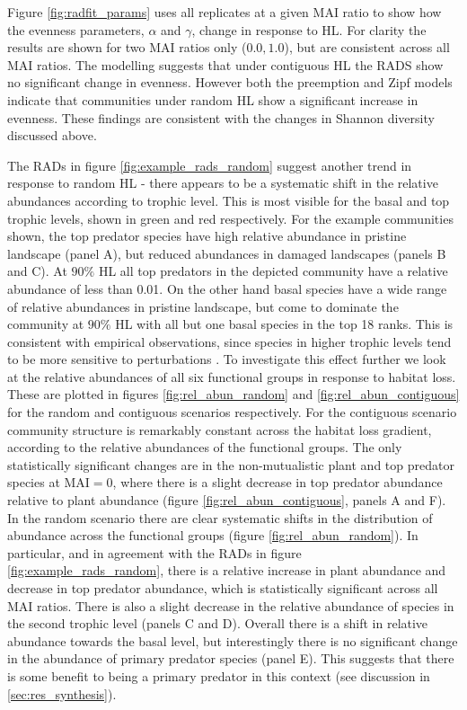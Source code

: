 Figure \ref{fig:radfit_params} uses all replicates at a given MAI ratio to show how the evenness parameters, $\alpha$ and $\gamma$, change in response to HL. For clarity the results are shown for two MAI ratios only ($0.0,1.0$), but are consistent across all MAI ratios. The modelling suggests that under contiguous HL the RADS show no significant change in evenness. However both the preemption and Zipf models indicate that communities under random HL show a significant increase in evenness. These findings are consistent with the changes in Shannon diversity discussed above. 

The RADs in figure \ref{fig:example_rads_random} suggest another trend in response to random HL - there appears to be a systematic shift in the relative abundances according to trophic level. This is most visible for the basal and top trophic levels, shown in green and red respectively. For the example communities shown, the top predator species have high relative abundance in pristine landscape (panel A), but reduced abundances in damaged landscapes (panels B and C). At $90\%$ HL all top predators in the depicted community have a relative abundance of less than 0.01. On the other hand basal species have a wide range of relative abundances in pristine landscape, but come to dominate the community at $90\%$ HL with all but one basal species in the top 18 ranks. This is consistent with empirical observations, since species in higher trophic levels tend to be more sensitive to perturbations \cite{raffaelli2004extinction,dobson2006habitat}. To investigate this effect further we look at the relative abundances of all six functional groups in response to habitat loss. These are plotted in figures \ref{fig:rel_abun_random} and \ref{fig:rel_abun_contiguous} for the random and contiguous scenarios respectively. For the contiguous scenario community structure is remarkably constant across the habitat loss gradient, according to the relative abundances of the functional groups. The only statistically significant changes are in the non-mutualistic plant and top predator species at MAI$=0$, where there is a slight decrease in top predator abundance relative to plant abundance (figure \ref{fig:rel_abun_contiguous}, panels A and F). In the random scenario there are clear systematic shifts in the distribution of abundance across the functional groups (figure \ref{fig:rel_abun_random}). In particular, and in agreement with the RADs in figure \ref{fig:example_rads_random}, there is a relative increase in plant abundance and decrease in top predator abundance, which is statistically significant across all MAI ratios. There is also a slight decrease in the relative abundance of species in the second trophic level (panels C and D). Overall there is a shift in relative abundance towards the basal level, but interestingly there is no significant change in the abundance of primary predator species (panel E). This suggests that there is some benefit to being a primary predator in this context (see discussion in \ref{sec:res_synthesis}).  


